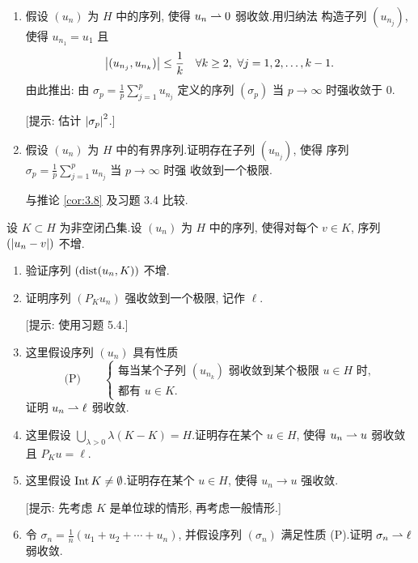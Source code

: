 \begin{exercise}
\label{exer:5.24}
\begin{enumerate}[label=\arabic*., leftmargin=2.2em, itemsep=0.3em]
	\item 假设 $(u_n)$ 为 $H$ 中的序列, 使得 $u_n\rightharpoonup0$ 弱收敛.用归纳法
	      构造子列 $(u_{n_j})$, 使得 $u_{n_1}=u_1$ 且
	      \begin{equation*}
	      \left|(u_{n_j},u_{n_k})\right|\le\frac1k
	      \quad\forall k\ge2,\ \forall j=1,2,\dots,k-1.
	      \end{equation*}
	      由此推出: 由 $\sigma_p=\frac1p\sum_{j=1}^pu_{n_j}$ 定义的序列
	      $(\sigma_p)$ 当 $p\to\infty$ 时强收敛于 0.

	      [提示: 估计 $\left|\sigma_p\right|^2$.]
	\item 假设 $(u_n)$ 为 $H$ 中的有界序列.证明存在子列 $(u_{n_j})$, 使得
	      序列 $\sigma_p=\frac1p\sum_{j=1}^pu_{n_j}$ 当 $p\to\infty$ 时强
	      收敛到一个极限.

	      与推论  \ref{cor:3.8} 及习题 3.4 比较.
\end{enumerate}
\end{exercise}

\begin{exercise}
\label{exer:5.25}
设 $K\subset H$ 为非空闭凸集.设 $(u_n)$ 为 $H$ 中的序列, 使得对每个
$v\in K$, 序列 $(\left|u_n-v\right|)$ 不增.
\begin{enumerate}[label=\arabic*., leftmargin=2.2em, itemsep=0.3em]
	\item 验证序列 $(\operatorname{dist}(u_n,K))$ 不增.
	\item 证明序列 $(P_Ku_n)$ 强收敛到一个极限, 记作 $\ell$.

	      [提示: 使用习题 5.4.]
	\item 这里假设序列 $(u_n)$ 具有性质
	      \begin{equation*}
	      \text{(P)}\qquad
	      \begin{cases}
	      \text{每当某个子列 }(u_{n_k})\text{ 弱收敛到某个极限 }u\in H\text{ 时,}\\
	      \text{都有 }u\in K.
	      \end{cases}
	      \end{equation*}
	      证明 $u_n\rightharpoonup\ell$ 弱收敛.
	\item 这里假设 $\bigcup_{\lambda>0}\lambda(K-K)=H$.证明存在某个 $u\in H$,
	      使得 $u_n\rightharpoonup u$ 弱收敛且 $P_Ku=\ell$.
	\item 这里假设 $\operatorname{Int} K\ne\emptyset$.证明存在某个 $u\in H$, 使得
	      $u_n\to u$ 强收敛.

	      [提示: 先考虑 $K$ 是单位球的情形, 再考虑一般情形.]
	\item 令 $\sigma_n=\frac1n(u_1+u_2+\cdots+u_n)$, 并假设序列 $(\sigma_n)$
	      满足性质 (P).证明 $\sigma_n\rightharpoonup\ell$ 弱收敛.
\end{enumerate}
\end{exercise}

